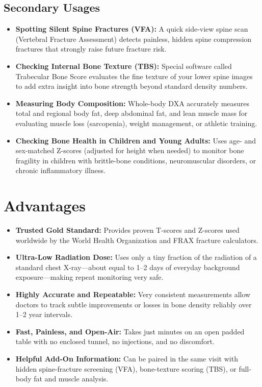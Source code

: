 \subsection{Secondary Usages}
\begin{itemize}
\item \textbf{Spotting Silent Spine Fractures (VFA):} A quick side-view spine scan (Vertebral Fracture Assessment) detects painless, hidden spine compression fractures that strongly raise future fracture risk.
\item \textbf{Checking Internal Bone Texture (TBS):} Special software called Trabecular Bone Score evaluates the fine texture of your lower spine images to add extra insight into bone strength beyond standard density numbers.
\item \textbf{Measuring Body Composition:} Whole-body DXA accurately measures total and regional body fat, deep abdominal fat, and lean muscle mass for evaluating muscle loss (sarcopenia), weight management, or athletic training.
\item \textbf{Checking Bone Health in Children and Young Adults:} Uses age- and sex-matched Z-scores (adjusted for height when needed) to monitor bone fragility in children with brittle-bone conditions, neuromuscular disorders, or chronic inflammatory illness.
\end{itemize}

\section{Advantages}
\begin{itemize}
\item \textbf{Trusted Gold Standard:} Provides proven T-scores and Z-scores used worldwide by the World Health Organization and FRAX fracture calculators.
\item \textbf{Ultra-Low Radiation Dose:} Uses only a tiny fraction of the radiation of a standard chest X-ray---about equal to 1--2 days of everyday background exposure---making repeat monitoring very safe.
\item \textbf{Highly Accurate and Repeatable:} Very consistent measurements allow doctors to track subtle improvements or losses in bone density reliably over 1--2 year intervals.
\item \textbf{Fast, Painless, and Open-Air:} Takes just minutes on an open padded table with no enclosed tunnel, no injections, and no discomfort.
\item \textbf{Helpful Add-On Information:} Can be paired in the same visit with hidden spine-fracture screening (VFA), bone-texture scoring (TBS), or full-body fat and muscle analysis.
\end{itemize}

